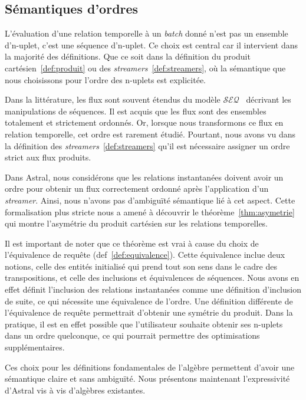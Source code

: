 \subsection{Sémantiques d'ordres}\label{sec:valid:expressivite:modele:ordres}
L'évaluation d'une relation temporelle à un \textit{batch} donné n'est pas un ensemble d'n-uplet, c'est une séquence d'n-uplet. Ce choix est central car il intervient dans la majorité des définitions. Que ce soit dans la définition du produit cartésien~\ref{def:produit} ou des \textit{streamers}~\ref{def:streamers}, où la sémantique que nous choisissons pour l'ordre des n-uplets est explicitée.

Dans la littérature, les flux sont souvent étendus du modèle $\mathcal{SEQ}$~\cite{Seshadri:seq} décrivant les manipulations de séquences. Il est acquis que les flux sont des ensembles totalement et strictement ordonnés. Or, lorsque nous transformons ce flux en relation temporelle, cet ordre est rarement étudié. Pourtant, nous avons vu dans la définition des \textit{streamers}~\ref{def:streamers} qu'il est nécessaire assigner un ordre strict aux flux produits. 

Dans Astral, nous considérons que les relations instantanées doivent avoir un ordre pour obtenir un flux correctement ordonné après l'application d'un \textit{streamer}. Ainsi, nous n'avons pas d'ambiguïté sémantique lié à cet aspect. Cette formalisation plus stricte nous a amené à découvrir le théorème~\ref{thm:asymetrie} qui montre l'asymétrie du produit cartésien sur les relations temporelles.

Il est important de noter que ce théorème est vrai à cause du choix de l'équivalence de requête (def~\ref{def:equivalence}). Cette équivalence inclue deux notions, celle des entités initialisé qui prend tout son sens dans le cadre des transpositions, et celle des inclusions et équivalences de séquences. Nous avons en effet définit l'inclusion des relations instantanées comme une définition d'inclusion de suite, ce qui nécessite une équivalence de l'ordre. Une définition différente de l'équivalence de requête permettrait d'obtenir une symétrie du produit. Dans la pratique, il est en effet possible que l'utilisateur souhaite obtenir ses n-uplets dans un ordre quelconque, ce qui pourrait permettre des optimisations supplémentaires.

Ces choix pour les définitions fondamentales de l'algèbre permettent d'avoir une sémantique claire et sans ambiguïté. Nous présentons maintenant l'expressivité d'Astral vis à vis d'algèbres existantes.